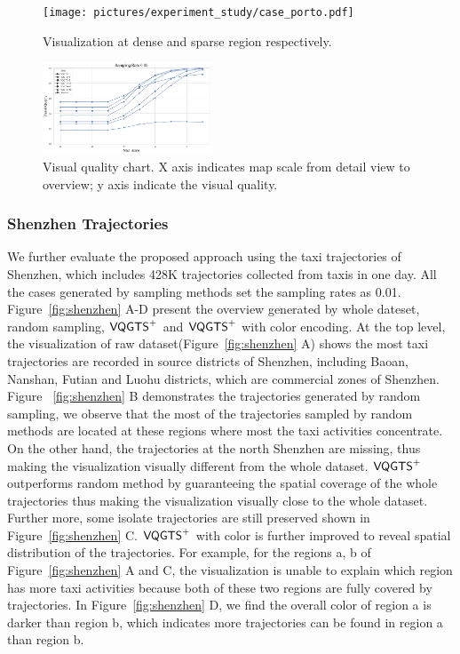 \begin{figure}[t]
	\centering
	\vspace{2mm}
	\texttt{[image: pictures/experiment\_study/case\_porto.pdf]}
	\caption{Visualization at dense and sparse region respectively.}
	\vspace{0mm}
	\label{fig:porto}
\end{figure}

\begin{figure}[t]
	\centering
	\vspace{2mm}
	\includegraphics[width=0.45\textwidth]{pictures/experiment_study/quanlity.png}
	\caption{Visual quality chart. X axis indicates map scale from detail view to overview; y axis indicate the visual quality. }
	\vspace{0mm}
	\label{fig:quality_chart}
\end{figure}


\subsubsection{Shenzhen Trajectories}
We further evaluate the proposed approach using the taxi trajectories of Shenzhen, which includes 428K trajectories collected from \QM{**} taxis in one day. All the cases generated by sampling methods set the sampling rates as 0.01. Figure~\ref{fig:shenzhen} A-D present the overview generated by whole dateset, random sampling, $\mathsf{VQGTS}^{+}$ and $\mathsf{VQGTS}^{+}$ with color encoding. At the top level, the visualization of raw dataset(Figure~\ref{fig:shenzhen} A) shows the most taxi trajectories are recorded in source districts of Shenzhen, including Baoan, Nanshan, Futian and Luohu districts, which are commercial zones of Shenzhen. Figure ~\ref{fig:shenzhen} B demonstrates the trajectories generated by random sampling, we observe that the most of the trajectories sampled by random methods are located at these regions where most the taxi activities concentrate. On the other hand, the trajectories at the north Shenzhen are missing, thus making the visualization visually different from the whole dataset.
$\mathsf{VQGTS}^{+}$ outperforms random method by guaranteeing the spatial coverage of the whole trajectories thus making the visualization visually close to the whole dataset. Further more, some isolate trajectories are still preserved shown in Figure~\ref{fig:shenzhen} C. $\mathsf{VQGTS}^{+}$ with color is further improved to reveal spatial distribution of the trajectories. For example, for the regions a, b of Figure~\ref{fig:shenzhen} A and C, the visualization is unable to explain which region has more taxi activities because both of these two regions are fully covered by trajectories. In Figure~\ref{fig:shenzhen} D, we find the overall color of region a is darker than region b, which indicates more trajectories can be found in region a than region b. 

